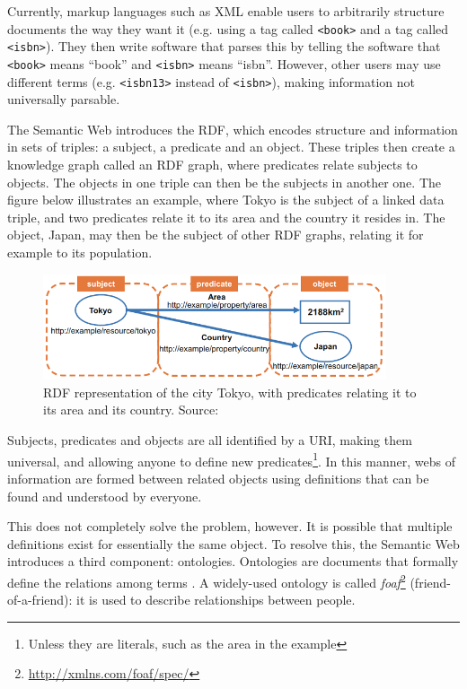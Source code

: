Currently, markup languages such as XML enable users to arbitrarily structure documents the way they want it (e.g. using a tag called \texttt{<book>} and a tag called \texttt{<isbn>}). They then write software that parses this by telling the software that \texttt{<book>} means ``book'' and \texttt{<isbn>} means ``isbn''. However, other users may use different terms (e.g. \texttt{<isbn13>} instead of \texttt{<isbn>}), making information not universally parsable. 

\noindent The Semantic Web introduces the \gls{RDF}, which encodes structure and information in sets of triples: a subject, a predicate and an object. These triples then create a knowledge graph called an RDF graph, where predicates relate subjects to objects. The objects in one triple can then be the subjects in another one. The figure below illustrates an example, where Tokyo is the subject of a linked data triple, and two predicates relate it to its area and the country it resides in. The object, Japan, may then be the subject of other RDF graphs, relating it for example to its population.

\begin{figure}[H]
    \centering
    \includegraphics[width = 0.9\textwidth]{images/background/linked-data.png}
    \caption{\acrshort{RDF} representation of the city Tokyo, with predicates relating it to its area and its country. Source: \citet{generating-pva}}
    \label{fig:linked-data}
\end{figure}

\noindent Subjects, predicates and objects are all identified by a URI, making them universal, and allowing anyone to define new predicates\footnote{Unless they are literals, such as the area in the example}. In this manner, webs of information are formed between related objects using definitions that can be found and understood by everyone.

This does not completely solve the problem, however. It is possible that multiple definitions exist for essentially the same object. To resolve this, the Semantic Web introduces a third component: ontologies. Ontologies are documents that formally define the relations among terms \citep{semantic-web}. A widely-used ontology is called \textit{foaf}\footnote{\url{ http://xmlns.com/foaf/spec/}} (friend-of-a-friend): it is used to describe relationships between people.

